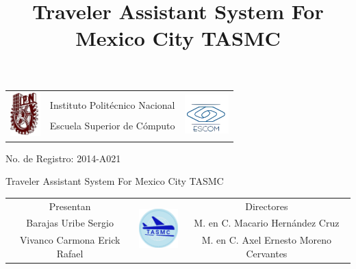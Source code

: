 \documentclass[12pt]{beamer}
\title[TASMC]{Traveler Assistant System For Mexico City TASMC}
\date{}
\begin{document}
\begin{frame}
	\begin{center}
	\begin{minipage}[t]{0.73\textwidth}	
		\begin{tabular}{ccc}
			\multirow{4}{*}{\includegraphics[height=1.7cm]{imagenes/ipn.png}} &
			&
     	 	\multirow{4}{*}{\includegraphics[height=1.5cm]{imagenes/escom.png}} \\
      		& Instituto Politécnico Nacional & \\
      		& Escuela Superior de Cómputo & \\
      		&&\\
		\end{tabular}
	\end{minipage}
	\end{center}
	
	\begin{center}
		\small No. de Registro: 2014-A021 \\
	\end{center}		
	
	\begin{center}
		\textcolor[RGB]{0,0,204}{\Large Traveler Assistant System For Mexico City TASMC}
	\end{center}		
		
	\begin{center}
	\begin{minipage}[t]{1\textwidth}	
		\begin{tabular}{ccc}
			Presentan & 
			\multirow{4}{*}{\includegraphics[height=1.7cm]{imagenes/logo.png}} & Directores \\
			\scriptsize Barajas Uribe Sergio & & \scriptsize  M. en C. Macario Hernández Cruz\\
			\scriptsize Vivanco Carmona Erick Rafael & & \scriptsize M. en C. Axel Ernesto Moreno Cervantes
		\end{tabular}
	\end{minipage}
	\end{center}
\end{frame}
\end{document}
